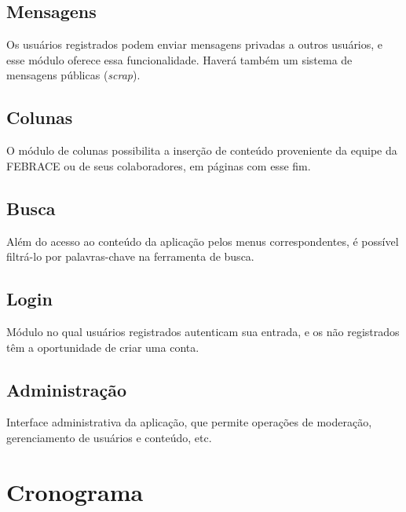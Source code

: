 \documentclass[a4paper,12pt,font=plain,header=plain]{abnt}
\begin{document}
		\section{Mensagens}
		Os usuários registrados podem enviar mensagens privadas a outros usuários, e esse módulo oferece essa funcionalidade. Haverá também um sistema de mensagens públicas (\textit{scrap}).

		\section{Colunas}
		O módulo de colunas possibilita a inserção de conteúdo proveniente da equipe da FEBRACE ou de seus colaboradores, em páginas com esse fim.

		\section{Busca}
		Além do acesso ao conteúdo da aplicação pelos menus correspondentes, é possível filtrá-lo por palavras-chave na ferramenta de busca.

		\section{Login}
		Módulo no qual usuários registrados autenticam sua entrada, e os não registrados têm a oportunidade de criar uma conta.

		\section{Administração}
		Interface administrativa da aplicação, que permite operações de moderação, gerenciamento de usuários e conteúdo, etc.

  	\chapter{Cronograma}
\end{document}
